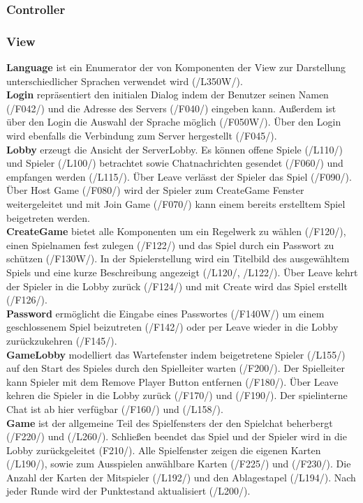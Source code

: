 \documentclass{article}
\begin{document}
	\subsubsection{Controller}
	\subsubsection{View}
			\textbf{Language} ist ein Enumerator der von Komponenten der View zur Darstellung unterschiedlicher Sprachen verwendet wird (/L350W/). \\
			\textbf{Login} repräsentiert den initialen Dialog indem der Benutzer seinen Namen (/F042/) und die Adresse des Servers (/F040/) eingeben kann. Außerdem ist über den Login die Auswahl der Sprache möglich (/F050W/). Über den Login wird ebenfalls die Verbindung zum Server hergestellt (/F045/).\\
			\textbf{Lobby} erzeugt die Ansicht der ServerLobby. Es können offene Spiele (/L110/) und Spieler (/L100/) betrachtet sowie Chatnachrichten gesendet (/F060/) und empfangen werden (/L115/). Über Leave verlässt der Spieler das Spiel (/F090/). Über Host Game (/F080/) wird der Spieler zum CreateGame Fenster weitergeleitet und mit Join Game (/F070/) kann einem bereits erstelltem Spiel beigetreten werden. \\
			\textbf{CreateGame} bietet alle Komponenten um ein Regelwerk zu wählen (/F120/), einen Spielnamen fest zulegen (/F122/) und das Spiel durch ein Passwort zu schützen (/F130W/). In der Spielerstellung wird ein Titelbild des ausgewähltem Spiels und eine kurze Beschreibung angezeigt (/L120/, /L122/). Über Leave kehrt der Spieler in die Lobby zurück (/F124/) und mit Create wird das Spiel erstellt (/F126/).\\
			\textbf{Password} ermöglicht die Eingabe eines Passwortes (/F140W/) um einem geschlossenem Spiel beizutreten (/F142/) oder  per Leave wieder in die Lobby zurückzukehren (/F145/). \\
			\textbf{GameLobby} modelliert das Wartefenster indem beigetretene Spieler (/L155/) auf den Start des Spieles durch den Spielleiter warten (/F200/). Der Spielleiter kann Spieler mit dem Remove Player Button entfernen (/F180/). Über Leave kehren die Spieler in die Lobby zurück (/F170/) und (/F190/). Der spielinterne Chat ist ab hier verfügbar (/F160/) und (/L158/). \\
			\textbf{Game} ist der allgemeine Teil des Spielfensters der den Spielchat beherbergt (/F220/) und (/L260/). Schließen beendet das Spiel und der Spieler wird in die Lobby zurückgeleitet (F210/). Alle Spielfenster zeigen die eigenen Karten (/L190/), sowie zum Ausspielen anwählbare Karten (/F225/) und (/F230/). Die Anzahl der Karten der Mitspieler (/L192/) und den Ablagestapel (/L194/). Nach jeder Runde wird der Punktestand  aktualisiert (/L200/).\\
\end{document}
